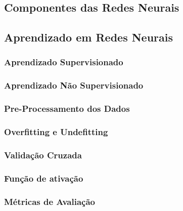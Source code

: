     \subsection{Componentes das Redes Neurais}

    \subsection{Aprendizado em Redes Neurais}
        \subsubsection{Aprendizado Supervisionado}  

        \subsubsection{Aprendizado Não Supervisionado}
        
        \subsubsection{Pre-Processamento dos Dados}

        \subsubsection{Overfitting e Undefitting}

        \subsubsection{Validação Cruzada}
        \subsubsection{Função de ativação}

        \subsubsection{Métricas de Avaliação}
            

